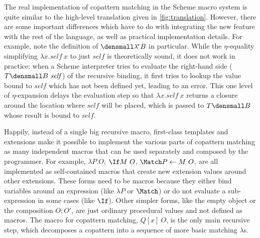 The real implementation of copattern matching in the Scheme macro system is quite similar to the high-level translation given in \cref{fig:translation}.
However, there are some important differences which have to do with integrating the new feature with the rest of the language, as well as practical implementation details.
For example, note the definition of $\den{\lamstar B}$ in particular.
While the $\eta$-equality simplifying $\lambda x. \mathit{self} ~ x$ to just $\mathit{self}$ is theoretically sound, it does not work in practice:
when a Scheme interpreter tries to evaluate the right-hand side ($T\den{B}~\mathit{self}$) of the recursive binding, it first tries to lookup the value bound to $\mathit{self}$ which has not been defined yet, leading to an error.
This one level of $\eta$-expansion delays the evaluation step so that $\lambda x. \mathit{self} ~ x$ returns a closure around the location where $\mathit{self}$ will be placed, which is passed to $T\den{B}$ whose result is bound to $\mathit{self}$.

Happily, instead of a single big recursive macro, first-class templates and extensions make it possible to implement the various parts of copattern matching as many independent macros that can be used separately and composed by the programmer. 
For example, $\lambda P. O$, $\If M ~ O$, $\Match P \gets M ~ O$, \etc are all implemented as self-contained macros that create new extension values around other extensions.
These forms need to be macros because they either bind variables around an expression (like $\lambda P$ or $\Match$) or do not evaluate a sub-expression in some cases (like $\If$).
Other simpler forms, like the empty object or the composition $O; O'$, are just ordinary procedural values and not defined as macros.
The macro for copattern matching, $Q[x]~O$, is the only main recursive step, which decomposes a copattern into a sequence of more basic matching $\lambda$s.

